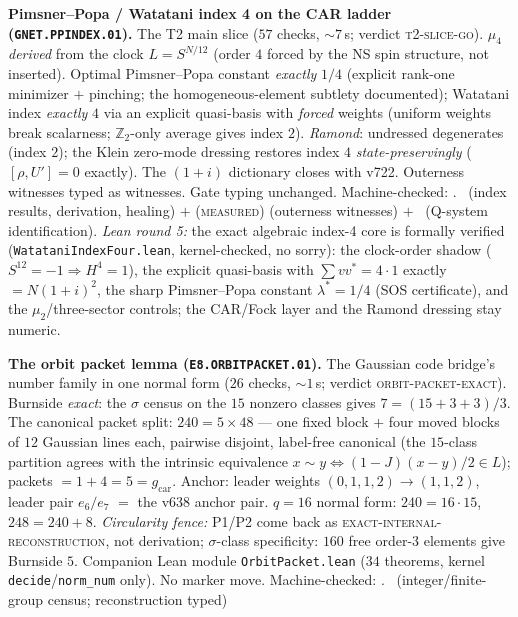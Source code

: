 \documentclass[11pt,a4paper]{article}
\newcommand{\Z}{\mathbb{Z}}
\theoremstyle{definition}
\begin{document}
\par\smallskip\noindent\textbf{Pimsner--Popa / Watatani index 4 on
the CAR ladder (\texttt{GNET.PPINDEX.01}).}
The T2 main slice ($57$ checks, ${\sim}7$\,s; verdict
\textsc{t2-slice-go}).  $\mu_4$ \emph{derived} from the clock
$L=S^{N/12}$ (order $4$ forced by the NS spin structure, not
inserted).  Optimal Pimsner--Popa constant \emph{exactly} $1/4$
(explicit rank-one minimizer $+$ pinching; the homogeneous-element
subtlety documented); Watatani index \emph{exactly} $4$ via an
explicit quasi-basis with \emph{forced} weights (uniform weights
break scalarness; $\Z_2$-only average gives index $2$).
\emph{Ramond}: undressed degenerates (index $2$); the Klein
zero-mode dressing restores index $4$ \emph{state-preservingly}
($[\rho,U']=0$ exactly).  The $(1{+}i)$ dictionary closes with
v722.  Outerness witnesses typed as witnesses.  Gate typing
unchanged.
Machine-checked: .
\mE\ (index results, derivation, healing) $+$ (\textsc{measured})
(outerness witnesses) $+$ \mO\ (Q-system identification).
\emph{Lean round 5:} the exact algebraic index-4 core is formally
verified (\texttt{WatataniIndexFour.lean}, kernel-checked, no
sorry): the clock-order shadow ($S^{12}=-1 \Rightarrow H^4=1$), the
explicit quasi-basis with $\sum v v^* = 4\cdot 1$ exactly
$= N(1{+}i)^2$, the sharp Pimsner--Popa constant $\lambda^*=1/4$
(SOS certificate), and the $\mu_2$/three-sector controls; the
CAR/Fock layer and the Ramond dressing stay numeric.
\par\smallskip

\par\smallskip\noindent\textbf{The orbit packet lemma
(\texttt{E8.ORBITPACKET.01}).}
The Gaussian code bridge's number family in one normal form ($26$
checks, ${\sim}1$\,s; verdict \textsc{orbit-packet-exact}).
Burnside \emph{exact}: the $\sigma$ census on the $15$ nonzero
classes gives $7=(15+3+3)/3$.  The canonical packet split:
$240=5\times48$ --- one fixed block $+$ four moved blocks of $12$
Gaussian lines each, pairwise disjoint, label-free canonical (the
$15$-class partition agrees with the intrinsic equivalence
$x\sim y\iff(1-J)(x-y)/2\in L$); packets $=1+4=5=g_{\mathrm{car}}$.
Anchor: leader weights $(0,1,1,2)\to(1,1,2)$, leader pair $e_6/e_7$
$=$ the v638 anchor pair.  $q=16$ normal form: $240=16\cdot15$,
$248=240+8$.  \emph{Circularity fence:} P1/P2 come back as
\textsc{exact-internal-reconstruction}, not derivation;
$\sigma$-class specificity: $160$ free order-$3$ elements give
Burnside $5$.  Companion Lean module \texttt{OrbitPacket.lean}
($34$ theorems, kernel \texttt{decide}/\texttt{norm\_num} only).
No marker move.
Machine-checked: .
\mE\ (integer/finite-group census; reconstruction typed)
\par\smallskip
\end{document}
